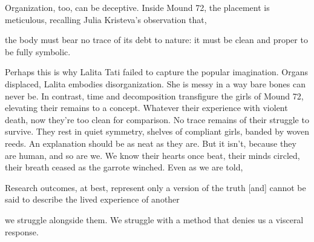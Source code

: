 Organization, too, can be deceptive. Inside Mound 72, the placement is meticulous, recalling Julia Kristeva's observation that, \begin{IJSRAquote}{\cite[102]{kristeva1982}}the body must bear no trace of its debt to nature: it must be clean and proper to be fully symbolic.\end{IJSRAquote} Perhaps this is why Lalita Tati failed to capture the popular imagination. Organs displaced, Lalita embodies disorganization. She is messy in a way bare bones can never be. In contrast, time and decomposition transfigure the girls of Mound 72, elevating their remains to a concept. Whatever their experience with violent death, now they're too clean for comparison. No trace remains of their struggle to survive. They rest in quiet symmetry, shelves of compliant girls, banded by woven reeds. An explanation should be as neat as they are. But it isn't, because they are human, and so are we. We know their hearts once beat, their minds circled, their breath ceased as the garrote winched. Even as we are told, \begin{IJSRAquote}{\cite[1153]{hewitt2007}}Research outcomes, at best, represent only a version of the truth [and] cannot be said to describe the lived experience of another\end{IJSRAquote} we struggle alongside them. We struggle with a method that denies us a visceral response. 

\nocite{bahn1992}
\printbibliography[
title={For further reading},
keywords={furtherreading},
heading=subbibliography]
\IJSRAclosing%